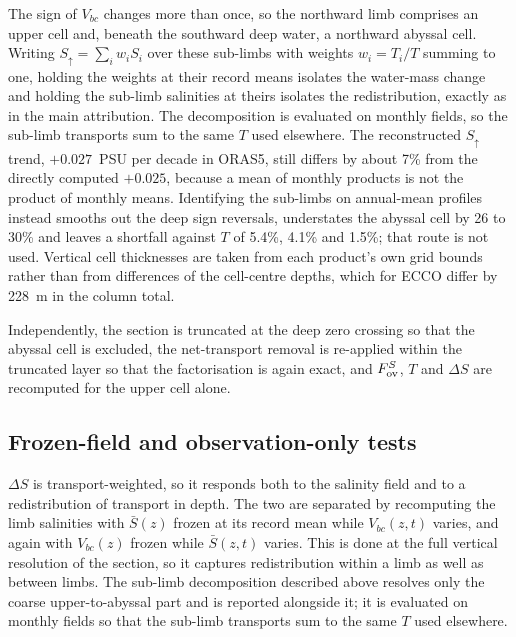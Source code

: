 The sign of $V_{bc}$ changes more than once, so the northward limb comprises an
upper cell and, beneath the southward deep water, a northward abyssal cell.
Writing $S_{\uparrow}=\sum_i w_i S_i$ over these sub-limbs with weights
$w_i=T_i/T$ summing to one, holding the weights at their record means isolates
the water-mass change and holding the sub-limb salinities at theirs isolates the
redistribution, exactly as in the main attribution. The decomposition is evaluated on monthly fields, so the
sub-limb transports sum to the same $T$ used elsewhere. The reconstructed
$S_{\uparrow}$ trend, $+0.027$~PSU per decade in ORAS5, still differs by about
7\% from the directly computed $+0.025$, because a mean of monthly products is
not the product of monthly means. Identifying the
sub-limbs on annual-mean profiles instead smooths out the deep sign reversals,
understates the abyssal cell by 26 to 30\% and leaves a shortfall against $T$ of
5.4\%, 4.1\% and 1.5\%; that route is not used. Vertical cell thicknesses are taken from
each product's own grid bounds rather than from differences of the cell-centre
depths, which for ECCO differ by 228~m in the column total.

Independently, the section is truncated at the deep zero crossing so that the
abyssal cell is excluded, the net-transport removal is re-applied within the
truncated layer so that the factorisation is again exact, and $F_{\mathrm{ov}}^{S}$, $T$ and
$\Delta S$ are recomputed for the upper cell alone.

\subsection*{Frozen-field and observation-only tests}

$\Delta S$ is transport-weighted, so it responds both to the salinity field and
to a redistribution of transport in depth. The two are separated by recomputing
the limb salinities with $\bar{S}(z)$ frozen at its record mean while
$V_{bc}(z,t)$ varies, and again with $V_{bc}(z)$ frozen while $\bar{S}(z,t)$
varies. This is done at the full vertical resolution of the section, so it
captures redistribution within a limb as well as between limbs. The sub-limb
decomposition described above resolves only the coarse upper-to-abyssal part and
is reported alongside it; it is evaluated on monthly fields so that the sub-limb
transports sum to the same $T$ used elsewhere.

